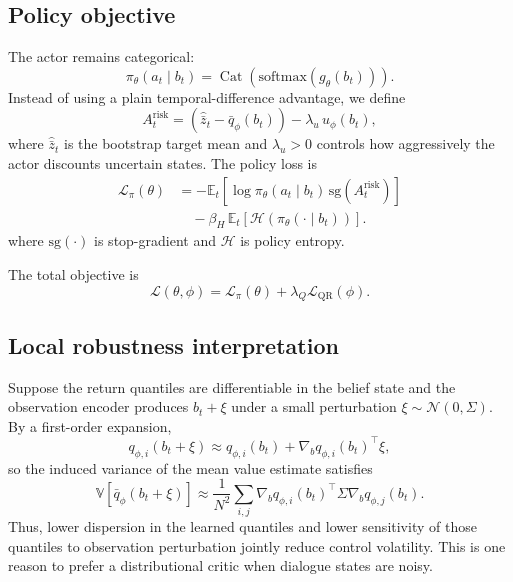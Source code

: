 \documentclass[conference]{IEEEtran}
\newcommand{\E}{\mathbb{E}}
\newcommand{\Var}{\mathbb{V}}
\begin{document}
\subsection{Policy objective}
The actor remains categorical:
\begin{equation}
\pi_\theta(a_t\mid b_t)=\operatorname{Cat}(\mathrm{softmax}(g_\theta(b_t))).
\end{equation}
Instead of using a plain temporal-difference advantage, we define
\begin{equation}
\label{eq:riskadv}
A_t^{\mathrm{risk}}
=
\left(\hat{\bar{z}}_t - \bar{q}_\phi(b_t)\right) - \lambda_u\,u_\phi(b_t),
\end{equation}
where \(\hat{\bar{z}}_t\) is the bootstrap target mean and \(\lambda_u>0\) controls how aggressively the actor discounts uncertain states. The policy loss is
\begin{equation}
\label{eq:actorloss}
\begin{aligned}
\mathcal{L}_{\pi}(\theta)
&=
-\E_t\!\left[\log \pi_\theta(a_t\mid b_t)\,\mathrm{sg}(A_t^{\mathrm{risk}})\right] \\
&\quad
-\beta_H\,\E_t\!\left[\mathcal{H}(\pi_\theta(\cdot\mid b_t))\right].
\end{aligned}
\end{equation}
where \(\mathrm{sg}(\cdot)\) is stop-gradient and \(\mathcal{H}\) is policy entropy.

The total objective is
\begin{equation}
\mathcal{L}(\theta,\phi)=\mathcal{L}_{\pi}(\theta)+\lambda_Q \mathcal{L}_{\mathrm{QR}}(\phi).
\end{equation}

\subsection{Local robustness interpretation}
Suppose the return quantiles are differentiable in the belief state and the observation encoder produces \(b_t+\xi\) under a small perturbation \(\xi\sim\mathcal{N}(0,\Sigma)\). By a first-order expansion,
\begin{equation}
q_{\phi,i}(b_t+\xi) \approx q_{\phi,i}(b_t) + \nabla_b q_{\phi,i}(b_t)^\top \xi,
\end{equation}
so the induced variance of the mean value estimate satisfies
\begin{equation}
\Var[\bar{q}_\phi(b_t+\xi)]
\approx
\frac{1}{N^2}\sum_{i,j}
\nabla_b q_{\phi,i}(b_t)^\top \Sigma \nabla_b q_{\phi,j}(b_t).
\end{equation}
Thus, lower dispersion in the learned quantiles and lower sensitivity of those quantiles to observation perturbation jointly reduce control volatility. This is one reason to prefer a distributional critic when dialogue states are noisy.
\end{document}
